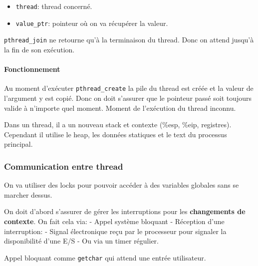 \begin{Shaded}
\begin{Highlighting}[]

\OperatorTok{(}\OperatorTok{,}  \OperatorTok{**}\OperatorTok{);}
\end{Highlighting}
\end{Shaded}

\begin{itemize}
\tightlist
\item
  \texttt{thread}: thread concerné.
\item
  \texttt{value\_ptr}: pointeur où on va récupérer la valeur.
\end{itemize}

\texttt{pthread\_join} ne retourne qu'à la terminaison du thread. Donc
on attend jusqu'à la fin de son exécution.

\paragraph{Fonctionnement}\label{fonctionnement}

Au moment d'exécuter \texttt{pthread\_create} la pile du thread est
créée et la valeur de l'argument y est copié. Donc on doit s'assurer que
le pointeur passé soit toujours valide à n'importe quel moment. Moment
de l'exécution du thread inconnu.

Dans un thread, il a un nouveau stack et contexte (\%esp, \%eip,
registres). Cependant il utilise le heap, les données statiques et le
text du processus principal.

\subsubsection{Communication entre
thread}\label{communication-entre-thread}

On va utiliser des locks pour pouvoir accéder à des variables globales
sans se marcher dessus.

On doit d'abord s'assurer de gérer les interruptions pour les
\textbf{changements de contexte}. On fait cela via: - Appel système
bloquant - Réception d'une interruption: - Signal électronique reçu par
le processeur pour signaler la disponibilité d'une E/S - Ou via un timer
régulier.

Appel bloquant comme \texttt{getchar} qui attend une entrée utilisateur.

